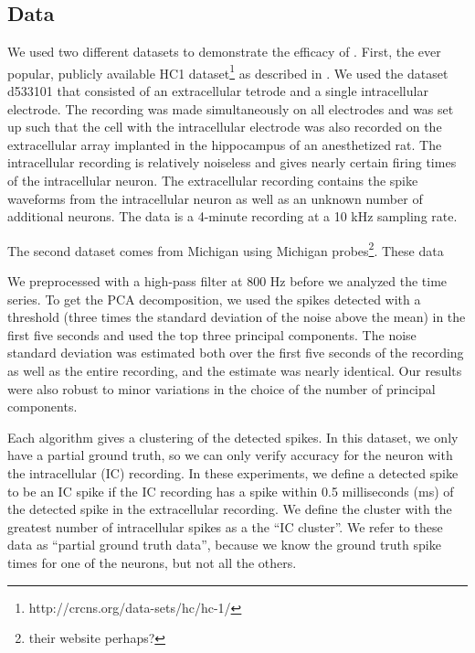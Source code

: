 
\subsection{Data}

We used two different datasets to demonstrate the efficacy of \smug.  First, the ever popular, publicly available HC1 dataset\footnote{http://crcns.org/data-sets/hc/hc-1/}
as described in \cite{Henze2000}.  We used the dataset d533101 that consisted of an extracellular tetrode and a single intracellular electrode.  The recording was made simultaneously on all electrodes and was set up such that the cell with the intracellular electrode was also recorded on the extracellular array implanted in the hippocampus of an anesthetized rat. The intracellular recording is relatively noiseless and gives nearly certain firing times of the intracellular neuron.  The extracellular recording contains the spike waveforms from the intracellular neuron as well as an unknown number of additional neurons.  The data is a 4-minute recording at a 10 kHz sampling rate.  

The second dataset comes from Michigan using Michigan probes\footnote{their website perhaps?}.  These data 



We preprocessed with a high-pass filter at 800 Hz before we analyzed the time series.  To get the PCA decomposition, we used the spikes detected with a threshold (three times the standard deviation of the noise above the mean) in the first five seconds and used the top three principal components.  The noise standard deviation was estimated both over the first five seconds of the recording as well as the entire recording, and the estimate was nearly identical.  Our results were also robust to minor variations in the choice of the number of principal components.

Each algorithm gives a clustering of the detected spikes.  In this dataset, we only have a partial ground truth, so we can only verify accuracy for the neuron with the intracellular (IC) recording.  In these experiments, we define a detected spike to be an IC spike if the IC recording has a spike within 0.5 milliseconds (ms) of the detected spike in the extracellular recording.  We define the cluster with the greatest number of intracellular spikes as a the ``IC cluster''.   We refer to these data as ``partial ground truth data'', because we know the ground truth spike times for one of the neurons, but not all the others.  




